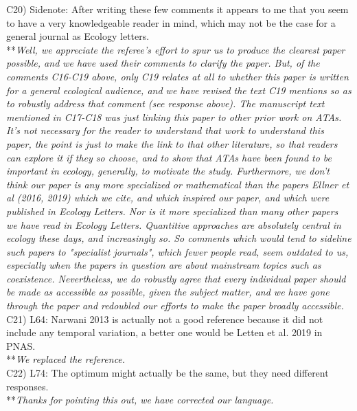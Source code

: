 \documentclass[letterpaper,11pt]{article}
\begin{document}
\noindent C20) Sidenote: After writing these few comments it appears to me that you seem to have a very knowledgeable reader in mind, which may not be the case for a general journal as Ecology letters. \\

\noindent ***\emph{Well, we appreciate the referee's effort to spur us to produce the clearest 
paper possible, and we have used their comments to clarify the paper. But, of the comments 
C16-C19 above, only C19 relates at all to whether this paper is written for a general ecological audience,
and we have revised the text C19 mentions so as to robustly address that comment (see response above). 
The manuscript text mentioned in C17-C18 was just linking this paper to other prior work on ATAs. 
It's not necessary for the reader to understand that work to understand this paper, the point is just to make 
the link to that other literature, so that readers can explore it if they so choose, 
and to show that ATAs have been found to be important in ecology, generally, to motivate the study.
Furthermore, we don't think our paper is any more specialized or mathematical than the papers Ellner et al (2016, 2019) which
we cite, and which inspired our paper, and which were published in Ecology Letters. Nor is it more 
specialized than many other papers we have read in Ecology Letters. Quantitive approaches are absolutely 
central in ecology these days, and increasingly so. So comments which would tend to sideline such papers to
"specialist journals", which fewer people read, seem outdated to us, especially when the papers in question 
are about mainstream topics such
as coexistence. Nevertheless, we do robustly agree that every individual paper should be made as accessible
as possible, given the subject matter, and we have gone through the paper and redoubled our efforts to make the 
paper broadly accessible.} \\

\noindent C21) L64: Narwani 2013 is actually not a good reference because it did not include any temporal variation, a better one would be Letten et al. 2019 in PNAS. \\

\noindent ***\emph{We replaced the reference.} \\

\noindent C22) L74: The optimum might actually be the same, but they need different responses. \\

\noindent ***\emph{Thanks for pointing this out, we have corrected our language.} \\
\end{document}

